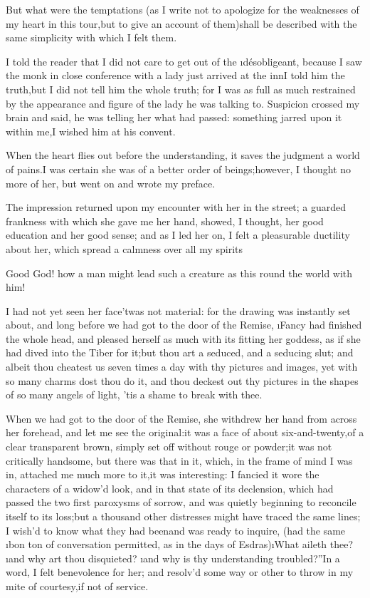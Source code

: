 \documentclass[twoside]{article}
\begin{document}
\tsk But what were the temptations (as I write not to apologize for the
weaknesses of my heart in this tour,\tsk but to give an account of
them)\tsk shall be described with the same simplicity with which I felt them.






 I told the reader that I did not care to get out of the
\i{désobligeant}, because I saw the monk in close conference with a lady
just arrived at the inn\tsk I told him the truth,\tsk but I did not tell him the
whole truth; for I was as full as much restrained by the appearance and
figure of the lady he was talking to.  Suspicion crossed my brain and
said, he was telling her what had passed: something jarred upon it within
me,\tsk I wished him at his convent.

When the heart flies out before the understanding, it saves the judgment
a world of pains.\tsk I was certain she was of a better order of
beings;\tsk however, I thought no more of her, but went on and wrote my
preface.

The impression returned upon my encounter with her in the street; a
guarded frankness with which she gave me her hand, showed, I thought, her
good education and her good sense; and as I led her on, I felt a
pleasurable ductility about her, which spread a calmness over all my
spirits\tsk 

\tsk Good God! how a man might lead such a creature as this round the world
with him!\tsk 

I had not yet seen her face\tsk ’twas not material: for the drawing was
instantly set about, and long before we had got to the door of the
Remise, \i{Fancy} had finished the whole head, and pleased herself as much
with its fitting her goddess, as if she had dived into the Tiber for
it;\tsk but thou art a seduced, and a seducing slut; and albeit thou cheatest
us seven times a day with thy pictures and images, yet with so many
charms dost thou do it, and thou deckest out thy pictures in the shapes
of so many angels of light, ’tis a shame to break with thee.

When we had got to the door of the Remise, she withdrew her hand from
across her forehead, and let me see the original:\tsk it was a face of about
six-and-twenty,\tsk of a clear transparent brown, simply set off without
rouge or powder;\tsk it was not critically handsome, but there was that in
it, which, in the frame of mind I was in, attached me much more to it,\tsk it
was interesting: I fancied it wore the characters of a widow’d look, and
in that state of its declension, which had passed the two first paroxysms
of sorrow, and was quietly beginning to reconcile itself to its loss;\tsk but
a thousand other distresses might have traced the same lines; I wish’d to
know what they had been\tsk and was ready to inquire, (had the same \i{bon ton}
of conversation permitted, as in the days of Esdras)\tsk \lqq \i{What aileth thee}?
\i{and why art thou disquieted}? \i{and why is thy understanding
troubled}?”\tsk In a word, I felt benevolence for her; and resolv’d some way
or other to throw in my mite of courtesy,\tsk if not of service.
\end{document}
